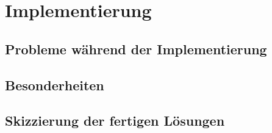 \section{Implementierung}

\subsection{Probleme während der Implementierung}

\subsection{Besonderheiten}

\subsection{Skizzierung der fertigen Lösungen}
